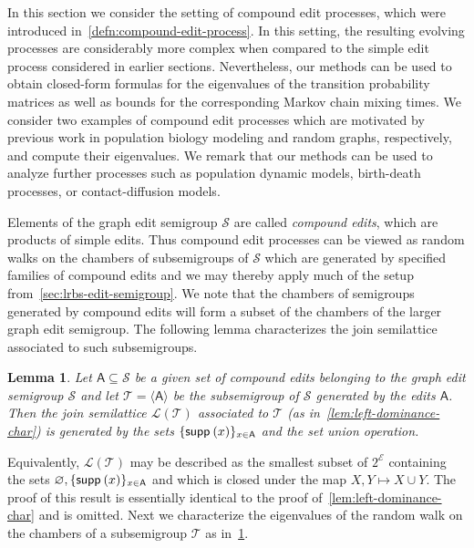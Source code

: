 \documentclass[11pt,a4paper]{article}
\newcommand{\supp}{{\mathsf{supp }\hspace{.075cm}}}
\newtheorem{lemma}[theorem]{Lemma}
\begin{document}
In this section we consider the setting of compound edit processes, which were introduced in~\cref{defn:compound-edit-process}. In this setting, the resulting evolving processes are considerably more complex when compared to the simple edit process considered in earlier sections. Nevertheless, our methods can be used to obtain closed-form formulas for the eigenvalues of the transition probability matrices as well as bounds for the corresponding Markov chain mixing times. We consider two examples of compound edit processes which are motivated by previous work in population biology modeling and random graphs, respectively, and compute their eigenvalues. We remark that our methods can be used to analyze further processes such as population dynamic models, birth-death processes, or contact-diffusion models.

Elements of the graph edit semigroup $\mathcal{S}$ are called \emph{compound edits}, which are products of simple edits. Thus compound edit processes can be viewed as random walks on the chambers of subsemigroups of $\mathcal{S}$ which are generated by specified families of compound edits and we may thereby apply much of the setup from~\cref{sec:lrbs-edit-semigroup}. We note that the chambers of semigroups generated by compound edits will form a subset of the chambers of the larger graph edit semigroup. The following lemma characterizes the join semilattice associated to such subsemigroups. 

\begin{lemma}\label{lem:subsemigroup}
    Let $\mathsf{A}\subseteq\mathcal{S}$ be a given set of compound edits belonging to the graph edit semigroup $\mathcal{S}$ and let $\mathcal{T}=\langle \mathsf{A}\rangle$ be the subsemigroup of $\mathcal{S}$ generated by the edits $\mathsf{A}$. Then the join semilattice $\mathcal{L}(\mathcal{T})$ associated to $\mathcal{T}$ (as in~\cref{lem:left-dominance-char}) is generated by the sets $\{\supp(x)\}_{x\in\mathsf{A}}$ and the set union operation.
\end{lemma}

Equivalently, $\mathcal{L}(\mathcal{T})$ may be described as the smallest subset of $2^\mathcal{E}$ containing the sets $\varnothing, \{\supp(x)\}_{x\in\mathsf{A}}$ and which is closed under the map $X,Y\mapsto X\cup Y$. The proof of this result is essentially identical to the proof of~\cref{lem:left-dominance-char} and is omitted. Next we characterize the eigenvalues of the random walk on the chambers of a subsemigroup $\mathcal{T}$ as in~\cref{lem:subsemigroup}.
\end{document}

